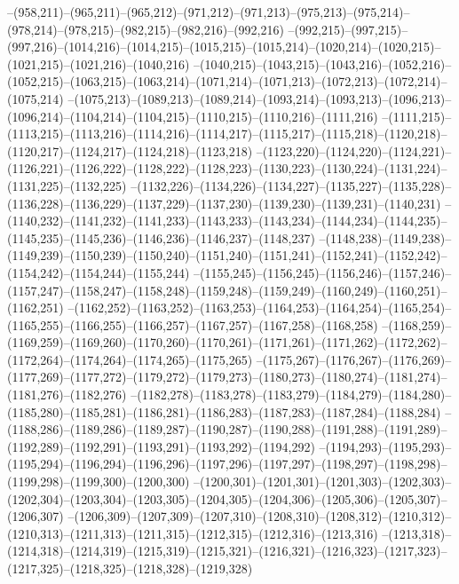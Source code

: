 --(958,211)--(965,211)--(965,212)--(971,212)--(971,213)--(975,213)--(975,214)--(978,214)--(978,215)--(982,215)--(982,216)--(992,216)
--(992,215)--(997,215)--(997,216)--(1014,216)--(1014,215)--(1015,215)--(1015,214)--(1020,214)--(1020,215)--(1021,215)--(1021,216)--(1040,216)
--(1040,215)--(1043,215)--(1043,216)--(1052,216)--(1052,215)--(1063,215)--(1063,214)--(1071,214)--(1071,213)--(1072,213)--(1072,214)--(1075,214)
--(1075,213)--(1089,213)--(1089,214)--(1093,214)--(1093,213)--(1096,213)--(1096,214)--(1104,214)--(1104,215)--(1110,215)--(1110,216)--(1111,216)
--(1111,215)--(1113,215)--(1113,216)--(1114,216)--(1114,217)--(1115,217)--(1115,218)--(1120,218)--(1120,217)--(1124,217)--(1124,218)--(1123,218)
--(1123,220)--(1124,220)--(1124,221)--(1126,221)--(1126,222)--(1128,222)--(1128,223)--(1130,223)--(1130,224)--(1131,224)--(1131,225)--(1132,225)
--(1132,226)--(1134,226)--(1134,227)--(1135,227)--(1135,228)--(1136,228)--(1136,229)--(1137,229)--(1137,230)--(1139,230)--(1139,231)--(1140,231)
--(1140,232)--(1141,232)--(1141,233)--(1143,233)--(1143,234)--(1144,234)--(1144,235)--(1145,235)--(1145,236)--(1146,236)--(1146,237)--(1148,237)
--(1148,238)--(1149,238)--(1149,239)--(1150,239)--(1150,240)--(1151,240)--(1151,241)--(1152,241)--(1152,242)--(1154,242)--(1154,244)--(1155,244)
--(1155,245)--(1156,245)--(1156,246)--(1157,246)--(1157,247)--(1158,247)--(1158,248)--(1159,248)--(1159,249)--(1160,249)--(1160,251)--(1162,251)
--(1162,252)--(1163,252)--(1163,253)--(1164,253)--(1164,254)--(1165,254)--(1165,255)--(1166,255)--(1166,257)--(1167,257)--(1167,258)--(1168,258)
--(1168,259)--(1169,259)--(1169,260)--(1170,260)--(1170,261)--(1171,261)--(1171,262)--(1172,262)--(1172,264)--(1174,264)--(1174,265)--(1175,265)
--(1175,267)--(1176,267)--(1176,269)--(1177,269)--(1177,272)--(1179,272)--(1179,273)--(1180,273)--(1180,274)--(1181,274)--(1181,276)--(1182,276)
--(1182,278)--(1183,278)--(1183,279)--(1184,279)--(1184,280)--(1185,280)--(1185,281)--(1186,281)--(1186,283)--(1187,283)--(1187,284)--(1188,284)
--(1188,286)--(1189,286)--(1189,287)--(1190,287)--(1190,288)--(1191,288)--(1191,289)--(1192,289)--(1192,291)--(1193,291)--(1193,292)--(1194,292)
--(1194,293)--(1195,293)--(1195,294)--(1196,294)--(1196,296)--(1197,296)--(1197,297)--(1198,297)--(1198,298)--(1199,298)--(1199,300)--(1200,300)
--(1200,301)--(1201,301)--(1201,303)--(1202,303)--(1202,304)--(1203,304)--(1203,305)--(1204,305)--(1204,306)--(1205,306)--(1205,307)--(1206,307)
--(1206,309)--(1207,309)--(1207,310)--(1208,310)--(1208,312)--(1210,312)--(1210,313)--(1211,313)--(1211,315)--(1212,315)--(1212,316)--(1213,316)
--(1213,318)--(1214,318)--(1214,319)--(1215,319)--(1215,321)--(1216,321)--(1216,323)--(1217,323)--(1217,325)--(1218,325)--(1218,328)--(1219,328)
